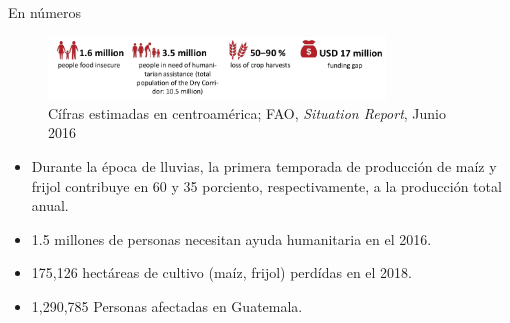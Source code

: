 \documentclass[]{beamer}
\begin{document}
\begin{frame}{En números}
    \begin{figure}
        \centering
        \includegraphics[width=0.8\textwidth]{Docs/cs_in_numbers}
        \caption{Cífras estimadas en centroamérica;  FAO, \textit{Situation Report}, Junio 2016}
        \label{fig:my_label}
    \end{figure}
    \begin{itemize}
      \item Durante la época de lluvias, la primera temporada de producción de maíz y frijol contribuye en 60 y 35 porciento, respectivamente, a la producción total anual.
      \item 1.5 millones de personas necesitan ayuda humanitaria en el 2016. %
      \item 175,126 hectáreas de cultivo (maíz, frijol) perdídas en el 2018. %
      \item 1,290,785 Personas afectadas en Guatemala. %
    \end{itemize}
\end{frame}
\end{document}
